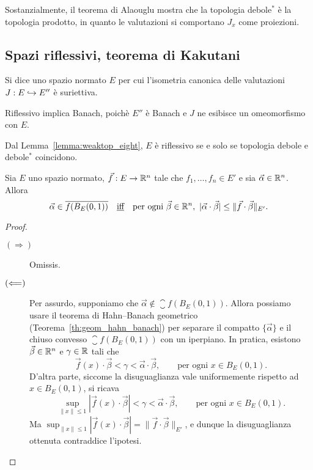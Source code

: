 \begin{remark}
	Sostanzialmente, il teorema di Alaouglu mostra che la topologia debole$^*$ è la topologia prodotto, in quanto le valutazioni si comportano $J_x$ come proiezioni.
\end{remark}

\subsection{Spazi riflessivi, teorema di Kakutani}
\begin{definition}
	Si dice  uno spazio normato $E$ per cui l'isometria canonica delle valutazioni $J : E \hookrightarrow E''$ è suriettiva.
\end{definition}

\begin{remark}
	Riflessivo implica Banach, poichè $E''$ è Banach e $J$ ne esibisce un omeomorfismo con $E$.
\end{remark}
\begin{remark}
	Dal Lemma~\ref{lemma:weaktop_eight}, $E$ è riflessivo se e solo se topologia debole e debole$^*$ coincidono.
\end{remark}

\begin{lemma}[Helly]
	Sia $E$ uno spazio normato, $\vec f : E \to \mathbb{R}^n$ tale che $f_1, \ldots, f_n \in E'$ e sia $\vec \alpha \in \mathbb{R}^n$.
	Allora
	\begin{equation*}
		\vec \alpha \in \overline{f(B_E(0,1))} \quad\text{\underline{iff}}\quad \text{per ogni $\vec \beta \in \mathbb{R}^n$},\ |\vec\alpha \cdot \vec\beta| \leq \|\vec f \cdot \vec \beta\|_{E'}.
	\end{equation*}
\end{lemma}
\begin{proof}
	\leavevmode
	\begin{description}
		\item[$(\Longrightarrow)$] Omissis.
		\item[$(\Longleftarrow)$] Per assurdo, supponiamo che $\vec \alpha \notin \closure{f(B_E(0,1))}$. Allora possiamo usare il teorema di Hahn--Banach geometrico (Teorema~\ref{th:geom_hahn_banach}) per separare il compatto $\{\vec\alpha\}$ e il chiuso convesso $\closure{f(B_E(0,1))}$ con un iperpiano. In pratica, esistono $\vec\beta \in \mathbb{R}^n$ e $\gamma \in \mathbb{R}$ tali che
		\begin{equation*}
			\vec f(x) \cdot \vec \beta < \gamma < \vec \alpha \cdot \vec \beta, \qquad \text{per ogni $x \in B_E(0,1)$}.
		\end{equation*}
		D'altra parte, siccome la disuguaglianza vale uniformemente rispetto ad $x \in B_E(0,1)$, si ricava
		\begin{equation*}
			\sup_{\|x\| \leq 1} |\vec f(x) \cdot \vec \beta| < \gamma < \vec \alpha \cdot \vec \beta, \qquad \text{per ogni $x \in B_E(0,1)$}.
		\end{equation*}
		Ma $\sup_{\|x\| \leq 1} |\vec f(x) \cdot \vec \beta| = \|\vec f \cdot \vec \beta\|_{E'}$, e dunque la disuguaglianza ottenuta contraddice l'ipotesi.
	\end{description}
\end{proof}

